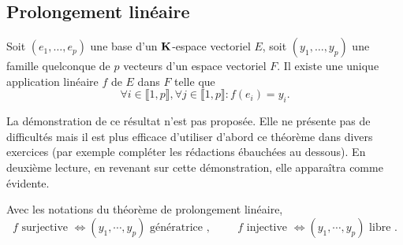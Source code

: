 \subsection{Prolongement linéaire} \label{subsec:ProlLin}
\begin{propn}\label{prop:ProlLin}
Soit $(e_1,\ldots,e_p)$ une base d'un $\mathbf{K}$-espace vectoriel $E$, soit $(y_1,\ldots,y_p)$ une famille quelconque de $p$ vecteurs d'un espace vectoriel $F$. Il existe une unique application linéaire $f$ de $E$ dans $F$ telle que
\begin{displaymath}
 \forall i\in \llbracket 1, p\rrbracket, \forall j\in \llbracket 1, p\rrbracket : f(e_i) = y_i .
\end{displaymath}
\end{propn}
\begin{demo}
 La démonstration de ce résultat n'est pas proposée. Elle ne présente pas de difficultés mais il est plus efficace d'utiliser d'abord ce théorème dans divers exercices (par exemple compléter les rédactions ébauchées au dessous). En deuxième lecture, en revenant sur cette démonstration, elle apparaîtra comme évidente.
\end{demo}
\begin{propn}\label{prop:CompProlLin}
 Avec les notations du théorème de prolongement linéaire,
\begin{displaymath}
 f \text{ surjective } \Leftrightarrow (y_1,\cdots,y_p) \text{ génératrice }, \hspace{1cm}
 f \text{ injective } \Leftrightarrow (y_1,\cdots,y_p) \text{ libre }. 
\end{displaymath} 
\end{propn}
